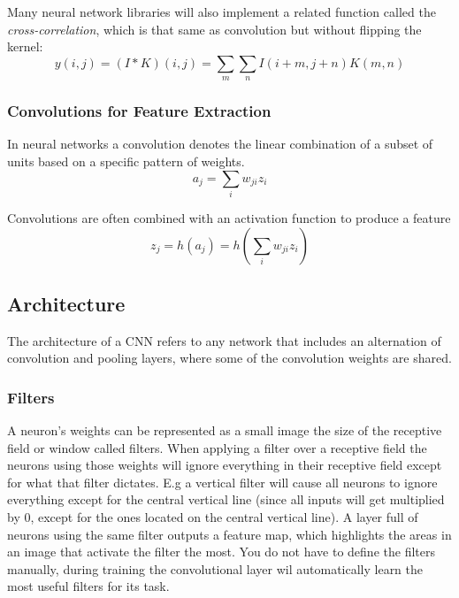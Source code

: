 \documentclass[12pt]{article}
\begin{document}
        Many neural network libraries will also implement a related function called the \textit{cross-correlation},
        which is that same as convolution but without flipping the kernel:
        $$ y(i,j) = (I * K)(i,j) = \sum_m \sum_n I(i+m, j+n)K(m,n) $$
    
        \subsubsection{Convolutions for Feature Extraction}
            In neural networks a convolution denotes the linear combination of a subset of units based on a specific
            pattern of weights. 
            $$ a_j = \sum_i w_{ji}z_i $$

            Convolutions are often combined with an activation function to produce a feature
            $$ z_j = h(a_j) = h(\sum_i w_{ji}z_i) $$
    
    \subsection{Architecture}
        The architecture of a CNN refers to any network that includes an alternation of convolution and pooling layers,
        where some of the convolution weights are shared.
                
        \subsubsection{Filters}
            A neuron's weights can be represented as a small image the size of the receptive field or window called
            filters. When applying a filter over a receptive field the neurons using those weights will ignore
            everything in their receptive field except for what that filter dictates. E.g a vertical filter will cause
            all neurons to ignore everything except for the central vertical line (since all inputs will get multiplied
            by 0, except for the ones located on the central vertical line). A layer full of neurons using the same
            filter outputs a feature map, which highlights the areas in an image that activate the filter the most. You
            do not have to define the filters manually, during training the convolutional layer wil automatically learn
            the most useful filters for its task.
\end{document}
